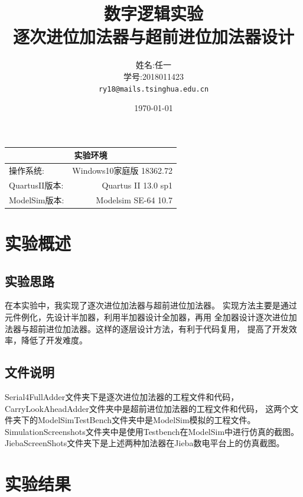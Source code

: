 \documentclass[UTF8]{article}
\title{数字逻辑实验 \\ 逐次进位加法器与超前进位加法器设计} %
\author{姓名:任一  \\学号:2018011423\\ \texttt{ry18@mails.tsinghua.edu.cn}} %
\date{\today} %
\begin{document}
\maketitle %
\begin{center}
    \begin{tabular}{l  r}
    \hline

        \multicolumn{2}{c}{实验环境} \\ \hline
        操作系统: & Windows10家庭版 18362.72 \\ \hline%
        QuartusII版本: & Quartus II 13.0 sp1 \\ \hline%

        ModelSim版本: & Modelsim SE-64 10.7 \\ \hline%

    \end{tabular}
\end{center}
\newpage


\section{实验概述}
\subsection{实验思路}
在本实验中，我实现了逐次进位加法器与超前进位加法器。
实现方法主要是通过元件例化，先设计半加器，利用半加器设计全加器，再用
全加器设计逐次进位加法器与超前进位加法器。这样的逐层设计方法，有利于代码复用，
提高了开发效率，降低了开发难度。

\subsection{文件说明}
Serial4FullAdder文件夹下是逐次进位加法器的工程文件和代码，
CarryLookAheadAdder文件夹中是超前进位加法器的工程文件和代码，
这两个文件夹下的ModelSimTestBench文件夹中是ModelSim模拟的工程文件。
SimulationScreenshots文件夹中是使用Testbench在ModelSim中进行仿真的截图。
JiebaScreenShots文件夹下是上述两种加法器在Jieba数电平台上的仿真截图。

\section{实验结果}
\end{document}

